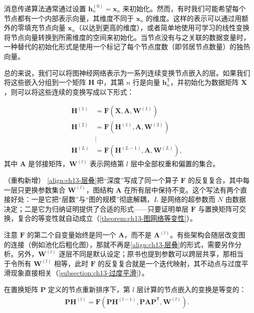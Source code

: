 \documentclass[../../main.tex]{subfiles}
\begin{document}
消息传递算法通常通过设置 $\bm{h}_n^{(0)}=\bm{x}_n$ 来初始化。然而，有时我们可能希望每个节点都有一个内部表示向量，其维度不同于 $\bm{x}_n$ 的维度。这样的表示可以通过用额外的零填充节点向量 $\bm{x}_n$（以达到更高的维度），或者简单地使用可学习的线性变换将节点向量转换到所需维度的空间来初始化。当节点没有与之关联的数据变量时，一种替代的初始化形式是使用一个标记了每个节点度数（即邻居节点数量）的独热向量。

总的来说，我们可以将图神经网络表示为一系列连续变换节点嵌入的层。如果我们将这些嵌入分组到一个矩阵 $\bm{H}$ 中，其第 $n$ 行是向量 $\bm{h}_n^{\mathsf T}$，并初始化为数据矩阵 $\bm{X}$，则可以将这些连续的变换写成以下形式：

\begin{definition}[图网络的层叠表示]\label{definition:ch13-图网络层叠}
\begin{align}
\bm{H}^{(1)}&=\bm{F}\!\left(\bm{X},\bm{A},\bm{W}^{(1)}\right)\nonumber\\
\bm{H}^{(2)}&=\bm{F}\!\left(\bm{H}^{(1)},\bm{A},\bm{W}^{(2)}\right)\nonumber\\
&\vdots\nonumber\\
\bm{H}^{(L)}&=\bm{F}\!\left(\bm{H}^{(L-1)},\bm{A},\bm{W}^{(L)}\right),
\label{align:ch13-层叠}
\end{align}
其中 $\bm{A}$ 是邻接矩阵，$\bm{W}^{(l)}$ 表示网络第 $l$ 层中全部权重和偏置的集合。
\end{definition}

\begin{remark}（重构新增）
\eqref{align:ch13-层叠}把“深度”写成了同一个算子 $\bm{F}$ 的反复复合，其中每一层只更换参数集合 $\bm{W}^{(l)}$，图结构 $\bm{A}$ 在所有层中保持不变。这个写法有两个直接好处：一是它把“层数”与“图的规模”彻底解耦，$L$ 是网络的超参数而 $N$ 由数据决定；二是它为归纳证明提供了合适的形式——只要证明单层 $\bm{F}$ 与置换矩阵可交换，复合的等变性就自动成立（\cref{theorem:ch13-图网络等变性}）。\par
注意 $\bm{F}$ 的第二个自变量始终是同一个 $\bm{A}$，而不是 $\bm{A}^{(l)}$。有些架构会随层改变图的连接（例如池化后粗化图），那就不再是\eqref{align:ch13-层叠}的形式，需要另作分析。另外，$\bm{W}^{(l)}$ 逐层不同是默认设定；原书也提到参数可以跨层共享，那相当于令所有 $\bm{W}^{(l)}$ 相等，此时 $\bm{F}$ 的反复复合就是一个迭代映射，其不动点与过度平滑现象直接相关（\cref{subsection:ch13-过度平滑}）。
\end{remark}

在置换矩阵 $\bm{P}$ 定义的节点重新排序下，第 $l$ 层计算的节点嵌入的变换是等变的：
\begin{align}
\bm{P}\bm{H}^{(l)}=\bm{F}\!\left(\bm{P}\bm{H}^{(l-1)},\bm{P}\bm{A}\bm{P}^{\mathsf T},\bm{W}^{(l)}\right).
\label{align:ch13-层等变性}
\end{align}
\end{document}
